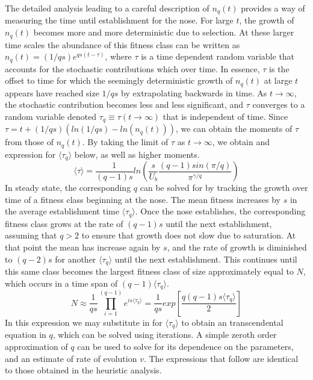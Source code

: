 \documentclass[12pt]{article}
\begin{document}
The detailed analysis leading to a careful description of $n_q(t)$ provides a way of measuring the time until establishment for the nose.  For large $t$, the growth of $n_q(t)$ becomes more and more deterministic due to selection.  At these larger time scales the abundance of this fitness class can be written as $n_q(t) = (1/qs) e^{qs(t-\tau)}$, where $\tau$ is a time dependent random variable that accounts for the stochastic contributions which over time.  In essence, $\tau$ is the offset to time for which the seemingly deterministic growth of $n_q(t)$ at large $t$ appears have reached size $1/qs$ by extrapolating backwards in time.  As $t\rightarrow \infty$, the stochastic contribution becomes less and less significant, and $\tau$ converges to a random variable denoted $\tau_q \equiv \tau (t\rightarrow \infty)$ that is independent of time.  Since $\tau = t +(1/qs)(ln(1/qs)-ln(n_q(t)))$, we can obtain the moments of $\tau$ from those of $n_q(t)$.  By taking the limit of $\tau$ as $t\rightarrow \infty$, we obtain and expression for $\langle \tau_q \rangle$ below, as well as higher moments. 
\begin{equation} 
\langle \tau \rangle = \frac{1}{(q-1)s}ln\left(\frac{s}{U_b}\frac{(q-1)sin(\pi/q)}{\pi^{\gamma/q}}\right)
\end{equation}
In steady state, the corresponding $q$ can be solved for by tracking the growth over time of a fitness class beginning at the nose.  The mean fitness increases by $s$ in the average establishment time $\langle \tau_q \rangle$.  Once the nose establishes, the corresponding fitness class grows at the rate of $(q-1)s$ until the next establishment, assuming that $q>2$ to ensure that growth does not slow due to saturation.  At that point the mean has increase again by $s$, and the rate of growth is diminished to $(q-2)s$ for another $\langle \tau_q \rangle$ until the next establishment.  This continues until this same class becomes the largest fitness class of size approximately equal to $N$, which occurs in a time span of $(q-1) \langle \tau_q \rangle$.
\begin{equation}
N \approx \frac{1}{qs} \prod_{i=1}^{(q-1)} e^{is \langle \tau_q \rangle}  = \frac{1}{qs} exp\left[ \frac{q(q-1)s \langle \tau_q \rangle}{2}\right]  
\end{equation}
In this expression we may substitute in for $\langle \tau_q \rangle$ to obtain an transcendental equation in $q$, which can be solved using iterations.  A simple zeroth order approximation of $q$ can be used to solve for its dependence on the parameters, and an estimate of rate of evolution $v$. The expressions that follow are identical to those obtained in the heuristic analysis.
\end{document}
